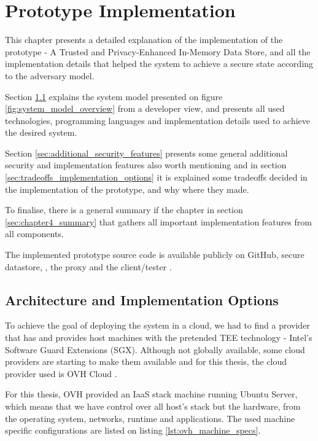 
\chapter{Prototype Implementation}
\label{cha:elaboration_plan}

This chapter presents a detailed explanation of the implementation of the prototype - A Trusted and Privacy-Enhanced In-Memory Data Store, and all the implementation details that helped the system to achieve a secure state according to the adversary model.

Section \ref{sec:architecture_implementation_options} explains the system model presented on figure \ref{fig:system_model_overview} from a developer view, and presents all used technologies, programming languages and implementation details used to achieve the desired system.

Section \ref{sec:additional_security_features} presents some general additional security and implementation features also worth mentioning and in section \ref{sec:tradeoffs_implementation_options} it is explained some tradeoffs decided in the implementation of the prototype, and why where they made. 

To finalise, there is a general summary if the chapter in section \ref{sec:chapter4_summary} that gathers all important implementation features from all components.

The implemented prototype source code is available publicly on GitHub, secure datastore, \cite{thesis-repository:container}, the proxy \cite{thesis-repository:proxy} and the client/tester \cite{thesis-repository:client}.

\section{Architecture and Implementation Options}
\label{sec:architecture_implementation_options}

To achieve the goal of deploying the system in a cloud, we had to find a provider that has and provides host machines with the pretended \gls{TEE} technology - Intel's Software Guard Extensions (\gls{SGX}). Although not globally available, some cloud providers are starting to make them available and for this thesis, the cloud provider used is OVH Cloud \cite{ovhcloud:1}. 

For this thesis, OVH provided an IaaS stack machine running Ubuntu Server, which means that we have control over all host's stack but the hardware, from the operating system, networks, runtime and applications. The used machine specific configurations are listed on listing \ref{lst:ovh_machine_specs}.

